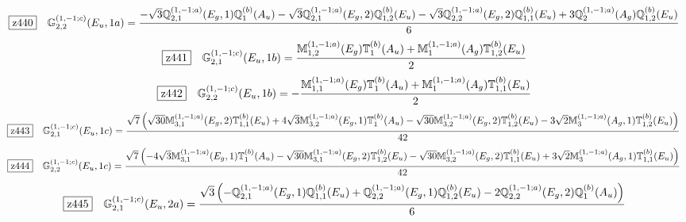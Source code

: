 \documentclass[fleqn,10pt,landscape]{jsarticle}
\begin{document}
\begin{dmath*}
\hspace*{3mm}\fbox{z440}\quad \mathbb{G}_{2,2}^{(1,-1;c)}(E_{u},1a)=\frac{- \sqrt{3} \mathbb{Q}_{2,1}^{(1,-1;a)}(E_{g},1) \mathbb{Q}_{1}^{(b)}(A_{u}) - \sqrt{3} \mathbb{Q}_{2,1}^{(1,-1;a)}(E_{g},2) \mathbb{Q}_{1,2}^{(b)}(E_{u}) - \sqrt{3} \mathbb{Q}_{2,2}^{(1,-1;a)}(E_{g},2) \mathbb{Q}_{1,1}^{(b)}(E_{u}) + 3 \mathbb{Q}_{2}^{(1,-1;a)}(A_{g}) \mathbb{Q}_{1,2}^{(b)}(E_{u})}{6}
\end{dmath*}
\begin{dmath*}
\hspace*{3mm}\fbox{z441}\quad \mathbb{G}_{2,1}^{(1,-1;c)}(E_{u},1b)=\frac{\mathbb{M}_{1,2}^{(1,-1;a)}(E_{g}) \mathbb{T}_{1}^{(b)}(A_{u}) + \mathbb{M}_{1}^{(1,-1;a)}(A_{g}) \mathbb{T}_{1,2}^{(b)}(E_{u})}{2}
\end{dmath*}
\begin{dmath*}
\hspace*{3mm}\fbox{z442}\quad \mathbb{G}_{2,2}^{(1,-1;c)}(E_{u},1b)=- \frac{\mathbb{M}_{1,1}^{(1,-1;a)}(E_{g}) \mathbb{T}_{1}^{(b)}(A_{u}) + \mathbb{M}_{1}^{(1,-1;a)}(A_{g}) \mathbb{T}_{1,1}^{(b)}(E_{u})}{2}
\end{dmath*}
\begin{dmath*}
\hspace*{3mm}\fbox{z443}\quad \mathbb{G}_{2,1}^{(1,-1;c)}(E_{u},1c)=\frac{\sqrt{7} \left(\sqrt{30} \mathbb{M}_{3,1}^{(1,-1;a)}(E_{g},2) \mathbb{T}_{1,1}^{(b)}(E_{u}) + 4 \sqrt{3} \mathbb{M}_{3,2}^{(1,-1;a)}(E_{g},1) \mathbb{T}_{1}^{(b)}(A_{u}) - \sqrt{30} \mathbb{M}_{3,2}^{(1,-1;a)}(E_{g},2) \mathbb{T}_{1,2}^{(b)}(E_{u}) - 3 \sqrt{2} \mathbb{M}_{3}^{(1,-1;a)}(A_{g},1) \mathbb{T}_{1,2}^{(b)}(E_{u})\right)}{42}
\end{dmath*}
\begin{dmath*}
\hspace*{3mm}\fbox{z444}\quad \mathbb{G}_{2,2}^{(1,-1;c)}(E_{u},1c)=\frac{\sqrt{7} \left(- 4 \sqrt{3} \mathbb{M}_{3,1}^{(1,-1;a)}(E_{g},1) \mathbb{T}_{1}^{(b)}(A_{u}) - \sqrt{30} \mathbb{M}_{3,1}^{(1,-1;a)}(E_{g},2) \mathbb{T}_{1,2}^{(b)}(E_{u}) - \sqrt{30} \mathbb{M}_{3,2}^{(1,-1;a)}(E_{g},2) \mathbb{T}_{1,1}^{(b)}(E_{u}) + 3 \sqrt{2} \mathbb{M}_{3}^{(1,-1;a)}(A_{g},1) \mathbb{T}_{1,1}^{(b)}(E_{u})\right)}{42}
\end{dmath*}
\begin{dmath*}
\hspace*{3mm}\fbox{z445}\quad \mathbb{G}_{2,1}^{(1,-1;c)}(E_{u},2a)=\frac{\sqrt{3} \left(- \mathbb{Q}_{2,1}^{(1,-1;a)}(E_{g},1) \mathbb{Q}_{1,1}^{(b)}(E_{u}) + \mathbb{Q}_{2,2}^{(1,-1;a)}(E_{g},1) \mathbb{Q}_{1,2}^{(b)}(E_{u}) - 2 \mathbb{Q}_{2,2}^{(1,-1;a)}(E_{g},2) \mathbb{Q}_{1}^{(b)}(A_{u})\right)}{6}
\end{dmath*}
\end{document}
